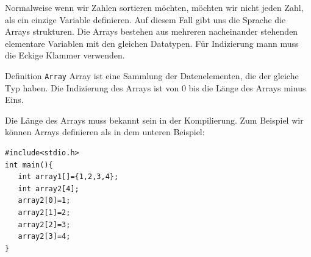 Normalweise wenn wir Zahlen sortieren möchten, möchten wir nicht jeden Zahl, als
ein einzige Variable definieren. Auf diesem Fall gibt uns die Sprache die Arrays 
strukturen. Die Arrays bestehen aus mehreren nacheinander stehenden elementare 
Variablen mit den gleichen Datatypen. Für Indizierung mann muss
die Eckige Klammer verwenden. 
\begin{myblock}{Definition \texttt{Array}}
Array ist eine Sammlung der Datenelementen, die der gleiche Typ haben. Die 
Indizierung des Arrays ist von 0 bis die Länge des Arrays minus Eins.
\end{myblock}
Die Länge des Arrays muss bekannt sein in der Kompilierung. Zum Beispiel wir 
können Arrays definieren als in dem unteren Beispiel:
\begin{lstlisting}
#include<stdio.h>
int main(){
   int array1[]={1,2,3,4};
   int array2[4];
   array2[0]=1;
   array2[1]=2;
   array2[2]=3;
   array2[3]=4;
}
\end{lstlisting}


